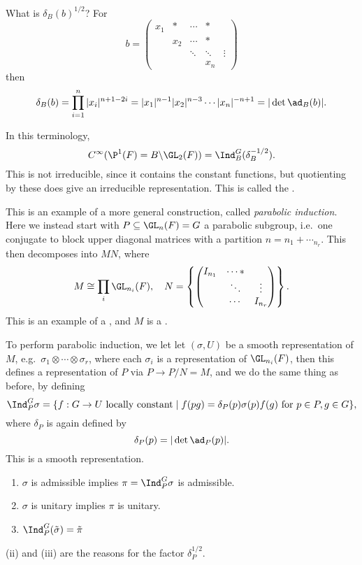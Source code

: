 \documentclass[a4paper]{article}
\begin{document}
What is $\delta_B(b)^{1/2}$? For
\[
  b = 
  \begin{pmatrix}
    x_1 & * & \cdots & *\\
    & x_2 &  \cdots & *\\
    & & \ddots & \ddots & \vdots\\
    & & & x_n
  \end{pmatrix}
\]
then
\[
  \delta_B(b) = \prod_{i = 1}^n |x_i|^{n + 1 - 2i} = |x_1|^{n - 1} |x_2|^{n - 3} \cdots |x_n|^{-n + 1} = |\det \ad_B(b)|.
\]
\begin{eg}
  In this terminology,
  \[
    C^\infty(\P^1(F) = B \backslash \GL_2(F)) = \Ind_B^G(\delta_B^{-1/2}).
  \]
  This is not irreducible, since it contains the constant functions, but quotienting by these does give an irreducible representation. This is called the .
\end{eg}
This is an example of a more general construction, called \emph{parabolic induction}. Here we instead start with $P \subseteq \GL_n(F) = G$ a parabolic subgroup, i.e.\ one conjugate to block upper diagonal matrices with a partition $n = n_1 + \cdots _ n_r$. This then decomposes into $MN$, where
\[
  M \cong \prod_i \GL_{n_i}(F),\quad N = \left\{
    \begin{pmatrix}
      I_{n_1} & \cdots *\\
      & \ddots & \vdots\\
      & \cdots & I_{n_r}
    \end{pmatrix}
  \right\}.
\]
This is an example of a , and $M$ is a .

To perform parabolic induction, we let let $(\sigma, U)$ be a smooth representation of $M$, e.g.\ $\sigma_1 \otimes \cdots \otimes \sigma_r$, where each $\sigma_i$ is a representation of $\GL_{n_i}(F)$, then this defines a representation of $P$ via $P \to P/N = M$, and we do the same thing as before, by defining
\[
  \Ind_P^G \sigma = \{f: G \to U\text{ locally constant} \mid f(pg) = \delta_P(p) \sigma(p) f(g)\text{ for }p \in P, g \in G\},
\]
where $\delta_P$ is again defined by
\[
  \delta_P(p) = |\det \ad_P(p)|.
\]
This is a smooth representation.

\begin{prop}\leavevmode
  \begin{enumerate}
    \item $\sigma$ is admissible implies $\pi = \Ind_P^G \sigma$ is admissible.
    \item $\sigma$ is unitary implies $\pi$ is unitary.
    \item $\Ind_P^G(\tilde{\sigma}) = \tilde{\pi}$ 
  \end{enumerate}
\end{prop}
(ii) and (iii) are the reasons for the factor $\delta_P^{1/2}$.
\end{document}
